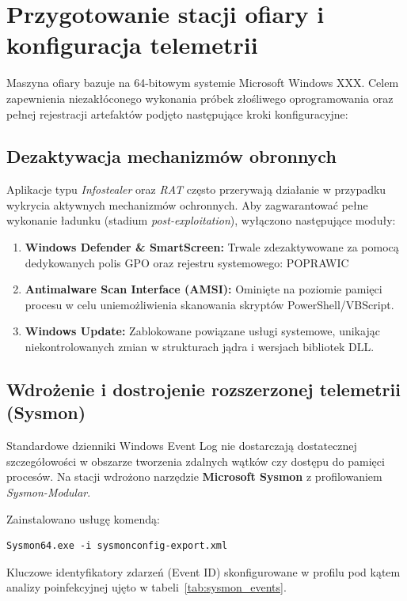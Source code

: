 \section{Przygotowanie stacji ofiary i konfiguracja telemetrii}\label{sec:konfiguracja_windows}

Maszyna ofiary bazuje na 64-bitowym systemie Microsoft Windows XXX. Celem zapewnienia niezakłóconego wykonania próbek złośliwego oprogramowania oraz pełnej rejestracji artefaktów podjęto następujące kroki konfiguracyjne:

\subsection{Dezaktywacja mechanizmów obronnych}
Aplikacje typu \textit{Infostealer} oraz \textit{RAT} często przerywają działanie w przypadku wykrycia aktywnych mechanizmów ochronnych. Aby zagwarantować pełne wykonanie ładunku (stadium \textit{post-exploitation}), wyłączono następujące moduły:
\begin{enumerate}
\item \textbf{Windows Defender \& SmartScreen:} Trwale zdezaktywowane za pomocą dedykowanych polis GPO oraz rejestru systemowego:
POPRAWIC
\item \textbf{Antimalware Scan Interface (AMSI):} Ominięte na poziomie pamięci procesu w celu uniemożliwienia skanowania skryptów PowerShell/VBScript.
\item \textbf{Windows Update:} Zablokowane powiązane usługi systemowe, unikając niekontrolowanych zmian w strukturach jądra i wersjach bibliotek DLL.
\end{enumerate}

\subsection{Wdrożenie i dostrojenie rozszerzonej telemetrii (Sysmon)}
Standardowe dzienniki Windows Event Log nie dostarczają dostatecznej szczegółowości w obszarze tworzenia zdalnych wątków czy dostępu do pamięci procesów. Na stacji wdrożono narzędzie \textbf{Microsoft Sysmon} z profilowaniem \textit{Sysmon-Modular}.

Zainstalowano usługę komendą:
\begin{verbatim}
Sysmon64.exe -i sysmonconfig-export.xml
\end{verbatim}

Kluczowe identyfikatory zdarzeń (Event ID) skonfigurowane w profilu pod kątem analizy poinfekcyjnej ujęto w tabeli~\ref{tab:sysmon_events}.

